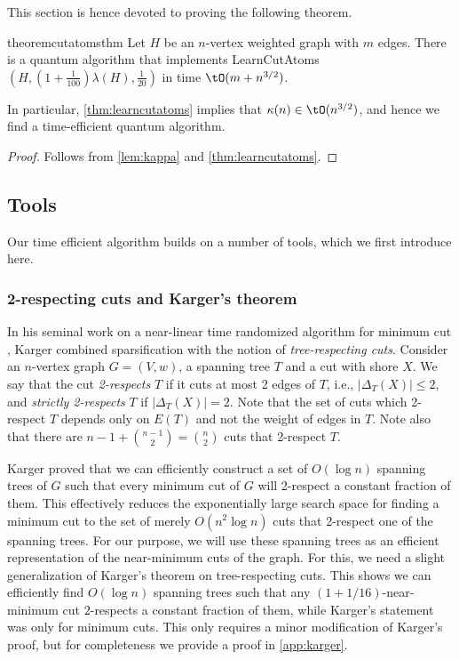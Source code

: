 This section is hence devoted to proving the following theorem. 
\begin{restatable}{theorem}{cutatomsthm} \label{thm:learncutatoms}
Let $H$ be an $n$-vertex weighted graph with $m$ edges.
There is a quantum algorithm that implements LearnCutAtoms$(H,(1+\frac{1}{100})\lambda(H),\frac{1}{20})$ in time $\tO(m + n^{3/2})$.
\end{restatable}

In particular, \cref{thm:learncutatoms} implies that $\kappa(n) \in \tO(n^{3/2})$, and hence we find a time-efficient quantum algorithm.
\thmtime*

\begin{proof}
Follows from \cref{lem:kappa} and \cref{thm:learncutatoms}.  
\end{proof}

\subsection{Tools}

Our time efficient algorithm builds on a number of tools, which we first introduce here.

\subsubsection{2-respecting cuts and Karger's theorem}

In his seminal work on a near-linear time randomized algorithm for minimum cut \cite{Karger00}, Karger combined sparsification with the notion of \emph{tree-respecting cuts}.
Consider an $n$-vertex graph $G = (V,w)$, a spanning tree $T$ and a cut with shore $X$.
We say that the cut \emph{2-respects} $T$ if it cuts at most 2 edges of $T$, i.e., $|\Delta_T(X)| \leq 2$, and \emph{strictly 2-respects} $T$ if $|\Delta_T(X)| = 2$.  Note that 
the set of cuts which 2-respect $T$ depends only on $E(T)$ and not the weight of edges in $T$.  Note also that there are $n-1 + \binom{n-1}{2} = \binom{n}{2}$ cuts that 2-respect $T$.

Karger proved that we can efficiently construct a set of $O(\log n)$ spanning trees of $G$ such that every minimum cut of $G$ will 2-respect a constant fraction of them.
This effectively reduces the exponentially large search space for finding a minimum cut to the set of merely $O(n^2 \log n)$ cuts that 2-respect one of the spanning trees.
For our purpose, we will use these spanning trees as an efficient representation of the near-minimum cuts of the graph.  For this, we need a slight generalization of Karger's theorem 
on tree-respecting cuts.  This shows we can efficiently find $O(\log n)$ spanning trees such that any $(1+1/16)$-near-minimum cut $2$-respects a constant fraction of them, while Karger's statement was 
only for minimum cuts.  This only requires a minor modification of Karger's proof, but for completeness we provide a proof in \cref{app:karger}. 

